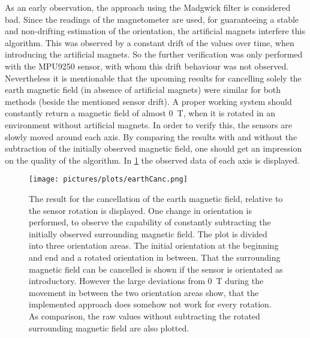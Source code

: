 As an early observation, the approach using the Madgwick filter is considered bad. Since the readings of the magnetometer are used, for guaranteeing a stable and non-drifting estimation of the orientation, the artificial magnets interfere this algorithm. This was observed by a constant drift of the values over time, when introducing the artificial magnets. So the further verification was only performed with the MPU9250 sensor, with whom this drift behaviour was not observed. Nevertheless it is mentionable that the upcoming results for cancelling solely the earth magnetic field (in absence of artificial magnets) were similar for both methods (beside the mentioned sensor drift). A proper working system should constantly return a magnetic field of almost \SI{0}{\tesla}, when it is rotated in an environment without artificial magnets. In order to verify this, the sensors are slowly moved around each axis. By comparing the results with and without the subtraction of the initially observed magnetic field, one should get an impression on the quality of the algorithm. In \ref{fig:earthCancelRes} the observed data of each axis is displayed.\\
\begin{figure}[!htb]
\centering
\texttt{[image: pictures/plots/earthCanc.png]} 
\caption[Quality of earth cancellation]
{The result for the cancellation of the earth magnetic field, relative to the sensor rotation is displayed. One change in orientation is performed, to observe the capability of constantly subtracting the initially observed surrounding magnetic field. The plot is divided into three orientation areas. The initial orientation at the beginning and end and a rotated orientation in between. That the surrounding magnetic field can be cancelled is shown if the sensor is orientated as introductory. However the large deviations from \SI{0}{\tesla} during the movement in between the two orientation areas show, that the implemented approach does somehow not work for every rotation. As comparison, the raw values without subtracting the rotated surrounding magnetic field are also plotted.}
\label{fig:earthCancelRes}
\end{figure}
